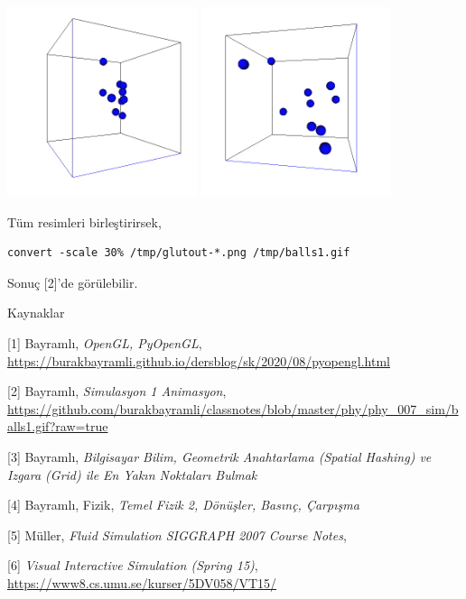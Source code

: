 \documentclass[12pt,fleqn]{article}\usepackage{../../common}
\begin{document}
\includegraphics[width=15em]{glutout-140.png}
\includegraphics[width=15em]{glutout-390.png}

Tüm resimleri birleştirirsek,

\begin{verbatim}
convert -scale 30% /tmp/glutout-*.png /tmp/balls1.gif
\end{verbatim}

Sonuç [2]'de görülebilir.


Kaynaklar

[1] Bayramlı, {\em OpenGL, PyOpenGL}, \url{https://burakbayramli.github.io/dersblog/sk/2020/08/pyopengl.html}

[2] Bayramlı, {\em Simulasyon 1 Animasyon},
    \url{https://github.com/burakbayramli/classnotes/blob/master/phy/phy_007_sim/balls1.gif?raw=true}

[3] Bayramlı, {\em Bilgisayar Bilim, Geometrik Anahtarlama (Spatial Hashing) ve Izgara (Grid) ile En Yakın Noktaları Bulmak}

[4] Bayramlı, Fizik, {\em Temel Fizik 2, Dönüşler, Basınç, Çarpışma}

[5] Müller, {\em Fluid Simulation SIGGRAPH 2007 Course Notes},

[6] {\em Visual Interactive Simulation (Spring 15)},
    \url{https://www8.cs.umu.se/kurser/5DV058/VT15/}
\end{document}
